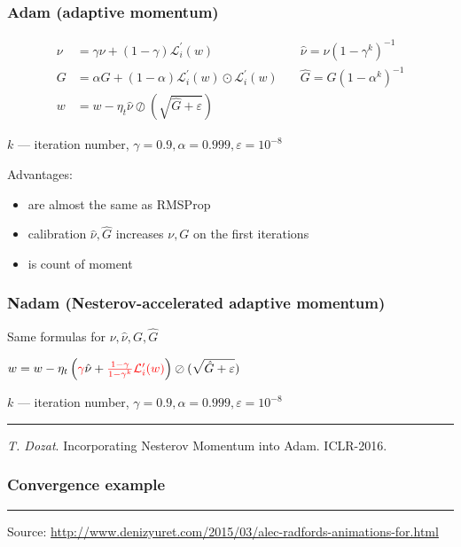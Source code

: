 \documentclass[fullscreen=true, bookmarks=true, hyperref={pdfencoding=unicode}]{beamer}
\begin{document}
\begin{frame}[t]
  \frametitle{Adam (adaptive momentum)}

  \pause
  \begin{align*}
  \nu &= \gamma \nu + (1-\gamma) \mathcal{L}_i^\prime(w) \quad     &\hat\nu = \nu(1-\gamma^k)^{-1} \\
    G &= {\alpha} G + {(1 - \alpha)}\mathcal{L}_i^\prime(w) \odot \mathcal{L}_i^\prime(w) \quad &\hat G = G(1-\alpha^k)^{-1} \\
    w &= w - {\eta_t}\hat\nu \oslash (\sqrt{\hat G + \varepsilon})
  \end{align*}

  $k$ — iteration number, $\gamma = 0.9, \alpha = 0.999, \varepsilon = 10^{-8}$

  \pause
  Advantages:
    \begin{itemize}
      \item are almost the same as RMSProp
      \item calibration $\hat\nu, \hat G$ increases $\nu, G$ on the first iterations
      \item is count of moment
    \end{itemize}


\end{frame}


\begin{frame}[t]
  \frametitle{Nadam (Nesterov-accelerated adaptive momentum)}

Same formulas for $\nu, \hat\nu, G, \hat G$

   $ w = w - {\eta_t}\left({\color{red}\gamma}\hat\nu + {\color{red}\frac{1-\gamma}{1-\gamma^k}\mathcal{L}_i^\prime (w)} \right) \oslash (\sqrt{\hat G+\varepsilon})$

   $k$ — iteration number, $\gamma = 0.9, \alpha = 0.999, \varepsilon = 10^{-8}$

   \noindent\rule{8cm}{0.4pt}

   {\it T. Dozat}. Incorporating Nesterov Momentum into Adam. ICLR-2016.

\end{frame}


\begin{frame}
  \frametitle{Convergence example}
  \begin{center}
  \end{center}

  \noindent\rule{8cm}{0.4pt}

   {\small Source: \href{http://www.denizyuret.com/2015/03/alec-radfords-animations-for.html}{http://www.denizyuret.com/2015/03/alec-radfords-animations-for.html}}

\end{frame}
\end{document}

